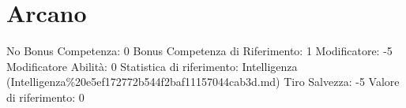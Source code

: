 \section{Arcano}\label{arcano}

\begin{description}
\tightlist
\item[Tags: ABI]
No Bonus Competenza: 0 Bonus Competenza di Riferimento: 1 Modificatore:
-5 Modificatore Abilità: 0 Statistica di riferimento: Intelligenza
(Intelligenza\%20e5ef172772b544f2baf11157044cab3d.md) Tiro Salvezza: -5
Valore di riferimento: 0
\end{description}

